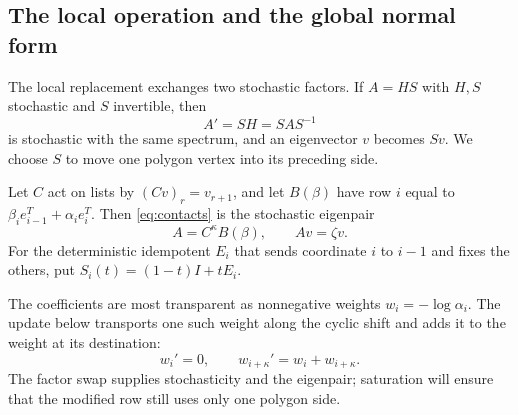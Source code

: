 \documentclass[11pt,a4paper]{article}
\theoremstyle{definition}
\theoremstyle{remark}
\numberwithin{equation}{section}
\begin{document}
\subsection{The local operation and the global normal form}
The local replacement exchanges two stochastic factors. If $A=HS$ with
$H,S$ stochastic and $S$ invertible, then
\[
 A'=SH=SAS^{-1}
\]
is stochastic with the same spectrum, and an eigenvector $v$ becomes
$Sv$. We choose $S$ to move one polygon vertex into its preceding side.

Let $C$ act on lists by $(Cv)_r=v_{r+1}$, and let $B(\beta)$ have row $i$ equal to $\beta_i e_{i-1}^T+\alpha_i e_i^T$. Then \eqref{eq:contacts} is the stochastic eigenpair
\[
 A=C^\kappa B(\beta),\qquad Av=\zeta v.
\]
For the deterministic idempotent $E_i$ that sends coordinate $i$ to $i-1$ and fixes the others, put $S_i(t)=(1-t)I+tE_i$.

The coefficients are most transparent as nonnegative weights
$w_i=-\log\alpha_i$. The update below transports one such weight
along the cyclic shift and adds it to the weight at its destination:
\[
 w_i'=0,\qquad w_{i+\kappa}'=w_i+w_{i+\kappa}.
\]
The factor swap supplies stochasticity and the eigenpair; saturation
will ensure that the modified row still uses only one polygon side.
\end{document}

